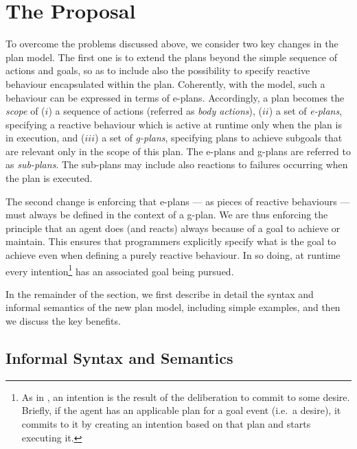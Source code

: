 \section{The {\aser} Proposal}
\label{sec:proposal}

To overcome the problems discussed above, we consider two key changes
in the plan model.
%
The first one is to extend the plans beyond the simple sequence of
actions and goals, so as to include also the possibility to specify
reactive behaviour encapsulated within the plan.
%
Coherently, with the {\asl} model, such a behaviour can be expressed
in terms of e-plans.
%
Accordingly, a plan becomes the \emph{scope} of ($i$) a sequence of
actions (referred as \emph{body actions}), ($ii$) a set of
\emph{e-plans}, specifying a reactive behaviour which is active at
runtime only when the plan is in execution, and ($iii$) a set of
\emph{g-plans}, specifying plans to achieve subgoals that are relevant
only in the scope of this plan. The e-plans and g-plans are referred
to as \emph{sub-plans}.
%
The sub-plans may include also reactions to failures occurring when
the plan is executed.

%
%
%
The second change is enforcing that e-plans --- as pieces of reactive
behaviours --- must always be defined in the context of a g-plan. We
are thus enforcing the principle that an agent does (and reacts)
always because of a goal to achieve or maintain.
%
This ensures that programmers explicitly specify what is the goal to
achieve even when defining a purely reactive behaviour.
%
In so doing, at runtime every intention\footnote{As in \asl, an
  intention is the result of the deliberation to commit to some
  desire. Briefly, if the agent has an applicable plan for a goal
  event (i.e.\ a desire), it commits to it by creating an intention
  based on that plan and starts executing it.} has an
associated goal being pursued.
%

In the remainder of the section, we first describe in detail the
syntax and informal semantics of the new plan model, including simple
examples, and then we discuss the key benefits.

\subsection{Informal Syntax and Semantics}
\label{sec:infSS}

